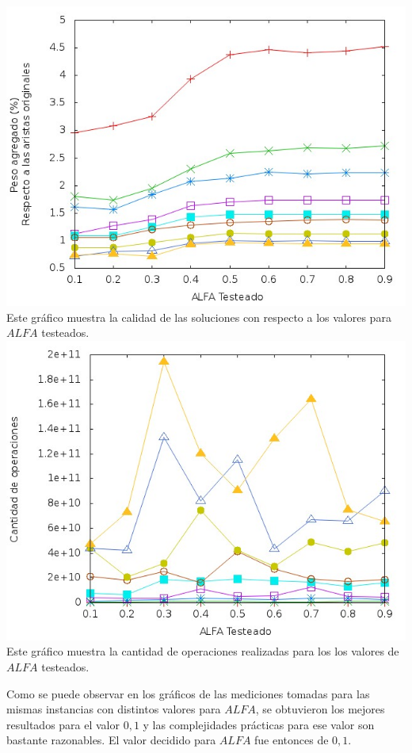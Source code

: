 \documentclass[11pt, a4paper, spanish]{article}
\begin{document}
\begin{center}
\centering \includegraphics[scale=0.40]{img/VariacionAlfa.jpg}\\
\small{Este gr\'afico muestra la calidad de las soluciones con respecto a los valores para $ALFA$ testeados.}
\centering \includegraphics[scale=0.40]{img/VariacionAlfaComplejidad.jpg}\\
\small{Este gr\'afico muestra la cantidad de operaciones realizadas para los los valores de $ALFA$ testeados.}
\end{center}
Como se puede observar en los gr\'aficos de las mediciones tomadas para las mismas instancias con distintos valores para $ALFA$, se obtuvieron los mejores resultados para el valor $0,1$ y las complejidades pr\'acticas para ese valor son bastante razonables. El valor decidido para $ALFA$ fue entonces de $0,1$.\\
\end{document}
